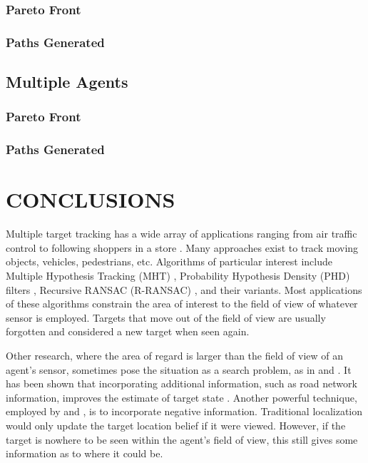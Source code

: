 \documentclass[letterpaper, 10 pt, conference]{ieeeconf}  %
\begin{document}
\subsubsection{Pareto Front}
\subsubsection{Paths Generated}
\subsection{Multiple Agents}
\subsubsection{Pareto Front}
\subsubsection{Paths Generated}
\section{CONCLUSIONS}\label{conclusions}

Multiple target tracking has a wide array of applications ranging from air traffic control \cite{Li1993} to following shoppers in a store \cite{Liu2007}. Many approaches exist to track moving objects, vehicles, pedestrians, etc. Algorithms of particular interest include Multiple Hypothesis Tracking (MHT) \cite{Reid1979}, Probability Hypothesis Density (PHD) filters \cite{Clark2007}, Recursive RANSAC (R-RANSAC) \cite{Niedfeldt2014}, and their variants. Most applications of these algorithms constrain the area of interest to the field of view of whatever sensor is employed. Targets that move out of the field of view are usually forgotten and considered a new target when seen again.

Other research, where the area of regard is larger than the field of view of an agent's sensor, sometimes pose the situation as a search problem, as in \cite{Allik2017} and \cite{Wong2005}. It has been shown that incorporating additional information, such as road network information, improves the estimate of target state \cite{Cheng2007}. Another powerful technique, employed by \cite{Allik2017} and \cite{Ahmed2017}, is to incorporate negative information. Traditional localization would only update the target location belief if it were viewed. However, if the target is nowhere to be seen within the agent's field of view, this still gives some information as to where it could be.
\end{document}
